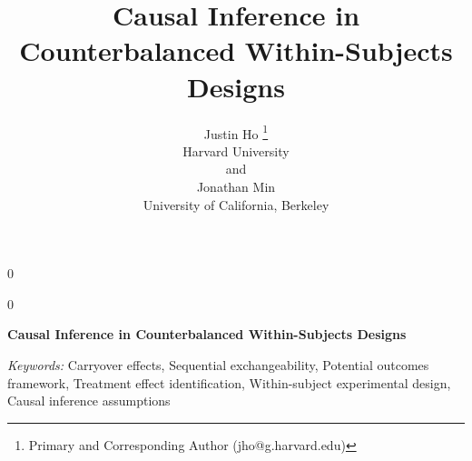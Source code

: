 \documentclass[12pt]{article}
\newcommand{\blind}{0}
\begin{document}
%

\def\spacingset#1{\renewcommand{\baselinestretch}%
{#1}\small\normalsize} \spacingset{1}



\blind
{
  \title{\bf Causal Inference in Counterbalanced Within-Subjects Designs}
  \author{Justin Ho
  \thanks{Primary and Corresponding Author (jho@g.harvard.edu)}\hspace{.2cm}\\
    Harvard University\\
    and \\
    Jonathan Min\\
    University of California, Berkeley}
  \maketitle
} \fi

\blind
{
  \bigskip
  \bigskip
  \bigskip
  \begin{center}
    {\LARGE\bf Causal Inference in Counterbalanced Within-Subjects Designs}
\end{center}
  \medskip
} \fi

\bigskip



\noindent%
{\it Keywords:}  Carryover effects, Sequential exchangeability, Potential outcomes framework, Treatment effect identification, Within-subject experimental design, Causal inference assumptions

\vfill

\newpage
\spacingset{1.45} %












\newpage


\end{document}

